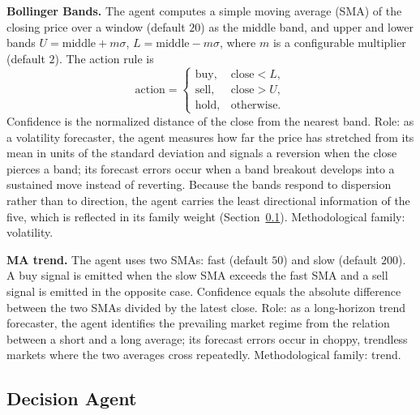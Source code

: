 \documentclass{ieeeaccess}
\begin{document}
\textbf{Bollinger Bands.} The agent computes a simple moving average (SMA) of the closing price over a window (default $20$) as the middle band, and upper and lower bands $U = \mathrm{middle} + m\sigma$, $L = \mathrm{middle} - m\sigma$, where $m$ is a configurable multiplier (default $2$). The action rule is
\begin{equation}
\mathrm{action} =
\begin{cases}
\mathrm{buy}, & \mathrm{close} < L, \\
\mathrm{sell}, & \mathrm{close} > U, \\
\mathrm{hold}, & \mathrm{otherwise}.
\end{cases}
\end{equation}
Confidence is the normalized distance of the close from the nearest band. Role: as a volatility forecaster, the agent measures how far the price has stretched from its mean in units of the standard deviation and signals a reversion when the close pierces a band; its forecast errors occur when a band breakout develops into a sustained move instead of reverting. Because the bands respond to dispersion rather than to direction, the agent carries the least directional information of the five, which is reflected in its family weight (Section~\ref{subsec:decision}). Methodological family: volatility.

\textbf{MA trend.} The agent uses two SMAs: fast (default $50$) and slow (default $200$). A buy signal is emitted when the slow SMA exceeds the fast SMA and a sell signal is emitted in the opposite case. Confidence equals the absolute difference between the two SMAs divided by the latest close. Role: as a long-horizon trend forecaster, the agent identifies the prevailing market regime from the relation between a short and a long average; its forecast errors occur in choppy, trendless markets where the two averages cross repeatedly. Methodological family: trend.

\subsection{Decision Agent}
\label{subsec:decision}
\end{document}
